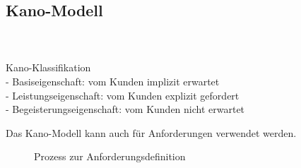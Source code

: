 \subsection{Kano-Modell}
\begin{multicols}{2}
	 \\
\columnbreak
\\
Kano-Klassifikation \\
- Basiseigenschaft: vom Kunden implizit erwartet \\
- Leistungseigenschaft: vom  Kunden explizit gefordert \\
- Begeisterungseigenschaft: vom Kunden nicht erwartet \\ 
\end{multicols}
Das Kano-Modell kann auch für Anforderungen 
verwendet werden. \\
\begin{figure}[ht]
	\centering
	\caption[]{Prozess zur Anforderungsdefinition}
\end{figure}